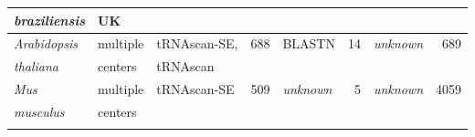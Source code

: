 \begin{footnotesize}
\begin{table}
\begin{center}
\begin{tabular}{|ll|lr|lr|lr|}
\emph{braziliensis}                      & UK                &               &          &                &    &                &          \\ \hline
\emph{Arabidopsis}                       & multiple          & tRNAscan-SE,  & 688      & BLASTN         & 14 & \emph{unknown} & 689      \\
\emph{thaliana}                          & centers           & tRNAscan      &          &                &    &                &          \\ \hline
\emph{Mus}                               & multiple          & tRNAscan-SE   & 509  & \emph{unknown} & 5  & \emph{unknown} & 4059 \\
\emph{musculus}                          & centers           &               &          &                &    &                &          \\ %
\hline
& & & & & & & \\
\end{tabular}


\end{center}
\end{table}
\end{footnotesize}
